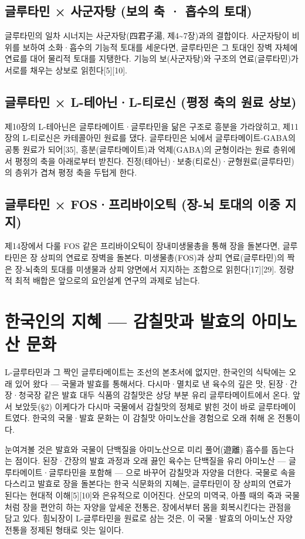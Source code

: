 \documentclass[12pt,oneside]{book}
\begin{document}
\subsection{글루타민 × 사군자탕 (보의 축 · 흡수의 토대)}

글루타민의 일차 시너지는 사군자탕(四君子湯, 제4\textasciitilde{}7장)과의 결합이다. 사군자탕이 비위를 보하여 소화·흡수의 기능적 토대를 세운다면, 글루타민은 그 토대인 장벽 자체에 연료를 대어 물리적 토대를 지탱한다. 기능의 보(사군자탕)와 구조의 연료(글루타민)가 서로를 채우는 상보로 읽힌다[5][10].

\subsection{글루타민 × L-테아닌·L-티로신 (평정 축의 원료 상보)}

제10장의 L-테아닌은 글루타메이트·글루타민을 닮은 구조로 흥분을 가라앉히고, 제11장의 L-티로신은 카테콜아민 원료를 댔다. 글루타민은 뇌에서 글루타메이트-GABA의 공통 원료가 되어[35], 흥분(글루타메이트)과 억제(GABA)의 균형이라는 원료 층위에서 평정의 축을 아래로부터 받친다. 진정(테아닌)·보충(티로신)·균형원료(글루타민)의 층위가 겹쳐 평정 축을 두텁게 한다.

\subsection{글루타민 × FOS·프리바이오틱 (장-뇌 토대의 이중 지지)}

제14장에서 다룰 FOS 같은 프리바이오틱이 장내미생물총을 통해 장을 돌본다면, 글루타민은 장 상피의 연료로 장벽을 돌본다. 미생물총(FOS)과 상피 연료(글루타민)의 짝은 장-뇌축의 토대를 미생물과 상피 양면에서 지지하는 조합으로 읽힌다[17][29]. 정량적 최적 배합은 앞으로의 요인설계 연구의 과제로 남는다.

\section{한국인의 지혜 — 감칠맛과 발효의 아미노산 문화}

L-글루타민과 그 짝인 글루타메이트는 조선의 본초서에 없지만, 한국인의 식탁에는 오래 있어 왔다 — 국물과 발효를 통해서다. 다시마·멸치로 낸 육수의 깊은 맛, 된장·간장·청국장 같은 발효 대두 식품의 감칠맛은 상당 부분 유리 글루타메이트에서 온다. 앞서 보았듯(§2) 이케다가 다시마 국물에서 감칠맛의 정체로 밝힌 것이 바로 글루타메이트였다. 한국의 국물·발효 문화는 이 감칠맛 아미노산을 경험으로 오래 취해 온 전통이다.

눈여겨볼 것은 발효와 국물이 단백질을 아미노산으로 미리 풀어(遊離) 흡수를 돕는다는 점이다. 된장·간장의 발효 과정과 오래 끓인 육수는 단백질을 유리 아미노산 — 글루타메이트·글루타민을 포함해 — 으로 바꾸어 감칠맛과 자양을 더한다. 국물로 속을 다스리고 발효로 장을 돌본다는 한국 식문화의 지혜는, 글루타민이 장 상피의 연료가 된다는 현대적 이해[5][10]와 은유적으로 이어진다. 산모의 미역국, 아플 때의 죽과 국물처럼 장을 편안히 하는 자양을 앞세운 전통은, 장에서부터 몸을 회복시킨다는 관점을 담고 있다. 힘뇌장이 L-글루타민을 원료로 삼는 것은, 이 국물·발효의 아미노산 자양 전통을 정제된 형태로 잇는 일이다.
\end{document}
